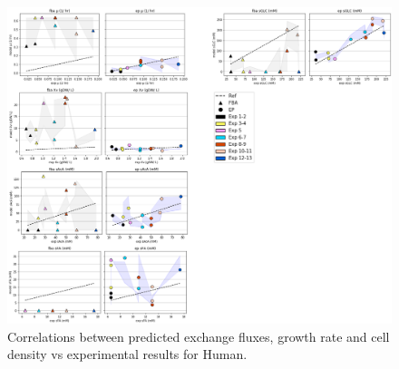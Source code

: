 \documentclass[]{article}
\begin{document}
	\begin{figure}
		\centering
		\includegraphics[scale = 0.55]{corr_s_EColi}
		\caption{Correlations between predicted exchange fluxes, growth rate and cell density vs experimental results for Human. }
		
		
	\end{figure}







	
	\newpage
	
		
	\newpage
	
	
\end{document}
